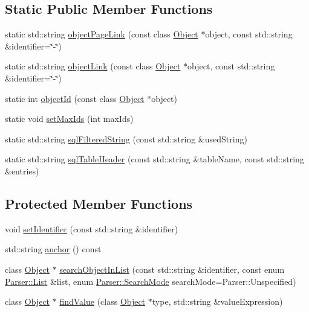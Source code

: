 \subsection*{Static Public Member Functions}
\begin{CompactItemize}
\item 
static std::string \hyperlink{classvjassdoc_1_1Object_1e7cc8e9b75c8555f996ecd9af27e446}{objectPageLink} (const class \hyperlink{classvjassdoc_1_1Object}{Object} $\ast$object, const std::string \&identifier=\char`\"{}-\char`\"{})
\item 
static std::string \hyperlink{classvjassdoc_1_1Object_0f115e83ce406e04b8ff20bacfb4acab}{objectLink} (const class \hyperlink{classvjassdoc_1_1Object}{Object} $\ast$object, const std::string \&identifier=\char`\"{}-\char`\"{})
\item 
static int \hyperlink{classvjassdoc_1_1Object_7da4025933552d2e896a8ea2534b3324}{objectId} (const class \hyperlink{classvjassdoc_1_1Object}{Object} $\ast$object)
\item 
static void \hyperlink{classvjassdoc_1_1Object_8edf943aa716a2da74d4f9f2c13e001b}{setMaxIds} (int maxIds)
\item 
static std::string \hyperlink{classvjassdoc_1_1Object_402f48ed33d2c82c1bccda774767ded3}{sqlFilteredString} (const std::string \&usedString)
\item 
static std::string \hyperlink{classvjassdoc_1_1Object_b229c2eb3c0c7d1e86d789986bffe3f1}{sqlTableHeader} (const std::string \&tableName, const std::string \&entries)
\end{CompactItemize}
\subsection*{Protected Member Functions}
\begin{CompactItemize}
\item 
void \hyperlink{classvjassdoc_1_1Object_3b69e9dd345029eef00edd37b4b171df}{setIdentifier} (const std::string \&identifier)
\item 
std::string \hyperlink{classvjassdoc_1_1Object_6ccc2dac8089947b3ad04b306ea700e8}{anchor} () const 
\item 
class \hyperlink{classvjassdoc_1_1Object}{Object} $\ast$ \hyperlink{classvjassdoc_1_1Object_7ec73267fcaaa923333318c63de594da}{searchObjectInList} (const std::string \&identifier, const enum \hyperlink{classvjassdoc_1_1Parser_4ef39527519272daf05a22b5276062ad}{Parser::List} \&list, enum \hyperlink{classvjassdoc_1_1Parser_ed659a05a08c7db4e2d233d133efdfda}{Parser::SearchMode} searchMode=Parser::Unspecified)
\item 
class \hyperlink{classvjassdoc_1_1Object}{Object} $\ast$ \hyperlink{classvjassdoc_1_1Object_4204a70565df779213ae78612560d42e}{findValue} (class \hyperlink{classvjassdoc_1_1Object}{Object} $\ast$type, std::string \&valueExpression)
\end{CompactItemize}
